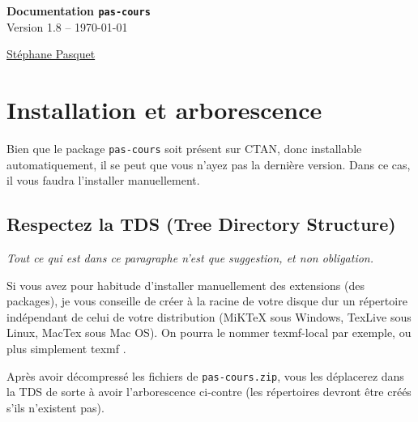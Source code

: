\documentclass[a4paper,french]{article}
\begin{document}
\begin{center}
\begin{tcolorbox}[head]
{\bfseries\LARGE Documentation \texttt{pas-cours} }\\[3mm]
{\large Version 1.8 -- \today}
\end{tcolorbox}

{\large 
\href{http://www.mathweb.fr/contact.html}{Stéphane Pasquet}}
\end{center}

\begin{tcolorbox}[toc]
\makeatletter
{}
\makeatother
\end{tcolorbox}

\newpage

\section{Installation et arborescence}

Bien que le package \texttt{pas-cours} soit présent sur CTAN, donc installable automatiquement, il se peut que vous n'ayez pas la dernière version. Dans ce cas, il vous faudra l'installer manuellement.

\subsection{Respectez la TDS (Tree Directory Structure)}

\textit{Tout ce qui est dans ce paragraphe n'est que suggestion, et non obligation.}

\bigskip

\begin{minipage}{\dimexpr\linewidth-9cm}
Si vous avez pour habitude d'installer manuellement des extensions (des packages), je vous conseille de créer à la racine de votre disque dur un répertoire indépendant de celui de votre distribution (MiKTeX sous Windows, TexLive sous Linux, MacTex sous Mac OS). On pourra le nommer \og texmf-local \fg{} par exemple, ou plus simplement \og texmf \fg.

\medskip

Après avoir décompressé les fichiers de \texttt{pas-cours.zip}, vous les déplacerez dans la TDS de sorte à avoir l'arborescence ci-contre (les répertoires devront être créés s'ils n'existent pas).
\end{minipage}
\hfill
{}
\end{document}
